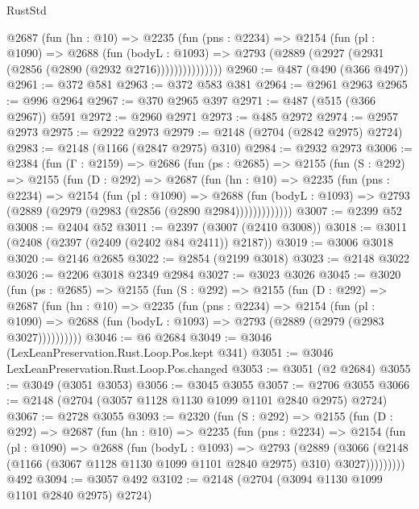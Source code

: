 \begin{lexlean}{RustStd}
\begin{coremodule}
            @2687
              (fun (hn : @10) =>
              @2235
                (fun (pns : @2234) =>
                @2154
                  (fun (pl : @1090) =>
                  @2688
                    (fun (bodyL : @1093) =>
                    @2793 (@2889 (@2927 (@2931 (@2856 (@2890 (@2932 @2716)))))))))))))))
@2960 := @487 (@490 (@366 @497))
@2961 := @372 @581
@2963 := @372 @583 @381
@2964 := @2961 @2963
@2965 := @996 @2964
@2967 := @370 @2965 @397
@2971 := @487 (@515 (@366 @2967)) @591
@2972 := @2960 @2971
@2973 := @485 @2972
@2974 := @2957 @2973
@2975 := @2922 @2973
@2979 := @2148 (@2704 (@2842 @2975) @2724)
@2983 := @2148 (@1166 (@2847 @2975) @310)
@2984 := @2932 @2973
@3006 := @2384
    (fun (Γ : @2159) =>
    @2686
      (fun (ps : @2685) =>
      @2155
        (fun (S : @292) =>
        @2155
          (fun (D : @292) =>
          @2687
            (fun (hn : @10) =>
            @2235
              (fun (pns : @2234) =>
              @2154
                (fun (pl : @1090) =>
                @2688
                  (fun (bodyL : @1093) =>
                  @2793 (@2889 (@2979 (@2983 (@2856 (@2890 @2984)))))))))))))
@3007 := @2399 @52
@3008 := @2404 @52
@3011 := @2397 (@3007 (@2410 @3008))
@3018 := @3011 (@2408 (@2397 (@2409 (@2402 @84 @2411)) @2187))
@3019 := @3006 @3018
@3020 := @2146 @2685
@3022 := @2854 (@2199 @3018)
@3023 := @2148 @3022
@3026 := @2206 @3018 @2349 @2984
@3027 := @3023 @3026
@3045 := @3020
    (fun (ps : @2685) =>
    @2155
      (fun (S : @292) =>
      @2155
        (fun (D : @292) =>
        @2687
          (fun (hn : @10) =>
          @2235
            (fun (pns : @2234) =>
            @2154
              (fun (pl : @1090) =>
              @2688 (fun (bodyL : @1093) => @2793 (@2889 (@2979 (@2983 @3027))))))))))
@3046 := @6 @2684
@3049 := @3046 (LexLeanPreservation.Rust.Loop.Pos.kept @341)
@3051 := @3046 LexLeanPreservation.Rust.Loop.Pos.changed
@3053 := @3051 (@2 @2684)
@3055 := @3049 (@3051 @3053)
@3056 := @3045 @3055
@3057 := @2706 @3055
@3066 := @2148 (@2704 (@3057 @1128 @1130 @1099 @1101 @2840 @2975) @2724)
@3067 := @2728 @3055
@3093 := @2320
    (fun (S : @292) =>
    @2155
      (fun (D : @292) =>
      @2687
        (fun (hn : @10) =>
        @2235
          (fun (pns : @2234) =>
          @2154
            (fun (pl : @1090) =>
            @2688
              (fun (bodyL : @1093) =>
              @2793
                (@2889
                  (@3066
                    (@2148 (@1166 (@3067 @1128 @1130 @1099 @1101 @2840 @2975) @310) @3027)))))))))
    @492
@3094 := @3057 @492
@3102 := @2148 (@2704 (@3094 @1130 @1099 @1101 @2840 @2975) @2724)

\end{coremodule}
\end{lexlean}
